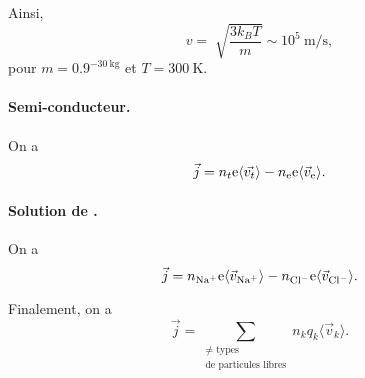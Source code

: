                 Ainsi,
                \begin{equation}
                    v=\sqrt[]{\frac{3k_B T}{m}}\sim 10^{5}~\si{\metre\per\second},
                \end{equation}
                pour $m=0.9^{-30~\si{\kilo\gram}}$ et $T=300~\si{\kelvin}$.

            \paragraph{Semi-conducteur.} 

                On a 
                \begin{equation}
                    \vec{j}=n_t\mathrm{e}\langle \vec{v_t}\rangle-n_{\mathrm{e}}\mathrm{e}\langle\vec{v}_{\mathrm{e}}\rangle.
                \end{equation}

            \paragraph{Solution de .}

                On a 
                \begin{equation}
                    \vec{j}=n_{\ce{Na+}}\e\langle\vec{v}_{\ce{Na+}}\rangle-n_{\ce{Cl-}}\e\langle\vec{v}_{\ce{Cl-}}\rangle.
                \end{equation}

            Finalement, on a 
            \begin{equation}
                \boxed{
                    \vec{j}=\sum_{\substack{\neq\text{ types}\\\text{de particules libres}}}n_k q_k\langle \vec{v}_k\rangle.
                }
            \end{equation}